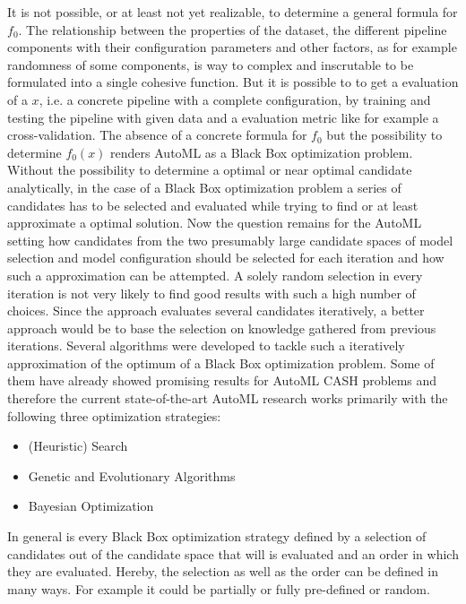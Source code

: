 It is not possible, or at least not yet realizable, to determine a general formula for $f_0$.
The relationship between the properties of the dataset, the different pipeline components with their configuration parameters and other factors, as for example randomness of some components, is way to complex and inscrutable to be formulated into a single cohesive function.
But it is possible to to get a evaluation of a $x$, i.e. a concrete pipeline with a complete configuration, by training and testing the pipeline with given data and a evaluation metric like for example a cross-validation.
The absence of a concrete formula for $f_0$ but the possibility to determine $f_0(x)$ renders AutoML as a Black Box optimization problem.\newline
Without the possibility to determine a optimal or near optimal candidate analytically, in the case of a Black Box optimization problem a series of candidates has to be selected and evaluated while trying to find or at least approximate a optimal solution.
Now the question remains for the AutoML setting how candidates from the two presumably large candidate spaces of model selection and model configuration should be selected for each iteration and how such a approximation can be attempted.\newline
A solely random selection in every iteration is not very likely to find good results with such a high number of choices.
Since the approach evaluates several candidates iteratively, a better approach would be to base the selection on knowledge gathered from previous iterations.\newline
Several algorithms were developed to tackle such a iteratively approximation of the optimum of a Black Box optimization problem.
Some of them have already showed promising results for AutoML CASH problems and therefore the current state-of-the-art AutoML research works primarily with the following three optimization strategies:
\begin{itemize}
    \item (Heuristic) Search
    \item Genetic and Evolutionary Algorithms
    \item Bayesian Optimization
\end{itemize}
In general is every Black Box optimization strategy defined by a selection of candidates out of the candidate space that will is evaluated and an order in which they are evaluated.
Hereby, the selection as well as the order can be defined in many ways.
For example it could be partially or fully pre-defined or random.
